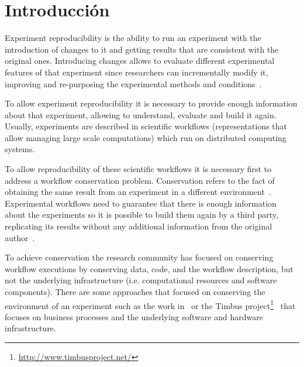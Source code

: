 
\chapter{Introducción} %

\label{Chapter1} %


\newcommand{\keyword}[1]{\textbf{#1}}
\newcommand{\tabhead}[1]{\textbf{#1}}
\newcommand{\code}[1]{\texttt{#1}}
\newcommand{\file}[1]{\texttt{\bfseries#1}}
\newcommand{\option}[1]{\texttt{\itshape#1}}

Experiment reproducibility is the ability to run an experiment with the introduction of changes to it and getting results that are consistent with the original ones. Introducing changes allows to evaluate different experimental features of that experiment since researchers can incrementally modify it, improving and re-purposing the experimental methods and conditions~\cite{stodden2010reproducible}.

To allow experiment reproducibility it is necessary to provide enough information about that experiment, allowing to understand, evaluate and build it again. Usually, experiments are described in scientific workflows (representations that allow managing large scale computations) which run on distributed computing systems. 

To allow reproducibility of these scientific workflows it is necessary first to address a workflow conservation problem. Conservation refers to the fact of obtaining the same result from an experiment in a different environment~\cite{conservation}. Experimental workflows need to guarantee that there is enough information about the experiments so it is possible to build them again by a third party, replicating its results without any additional information from the original author~\cite{garijo2013quantifying}. 

To achieve conservation the research community has focused on conserving workflow executions by conserving data, code, and the workflow description, but not the underlying infrastructure (i.e. computational resources and software components). There are some approaches that focused on conserving the environment of an experiment such as the work in~\cite{santana2017reproducibility} or the Timbus project\footnote{\url{http://www.timbusproject.net/}}~\cite{dappert2013describing} that focuses on business processes and the underlying software and hardware infrastructure.

